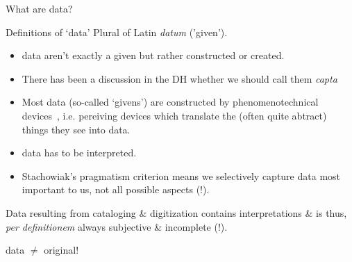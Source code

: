 \begin{frame}{What are data?}
\begin{block}{Definitions of `data'}
Plural of Latin \emph{datum} ('given'). 
\end{block}

\begin{itemize}\footnotesize 
    \item data aren't exactly a given but rather constructed or created.
    \item There has been a discussion in the DH whether we should call them \emph{capta}~\parencite{Drucker2011dataCapta}
    \item Most data (so-called `givens') are constructed by phenomenotechnical devices~\parencite{bachelard1968}, i.e. pereiving devices which translate the (often quite abtract) things they see into data.
    \item data has to be interpreted.
    \item Stachowiak's pragmatism criterion means we selectively capture data most important to us, not all possible aspects (!).
\end{itemize}

Data resulting from cataloging \& digitization contains interpretations \& is thus, 
\emph{per definitionem} always subjective \& incomplete (!).

\alert{data $\neq$ original!}

\end{frame}

